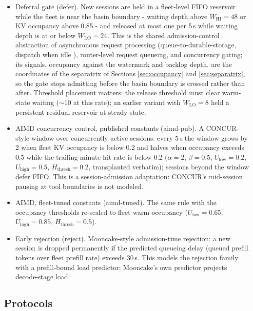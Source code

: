 \begin{itemize}
\item Deferral gate (defer). New sessions are held in a fleet-level FIFO
  reservoir while the fleet is near the basin boundary - waiting
  depth above $W_{\mathrm{HI}} = 48$ or KV occupancy above 0.85 - and released at
  most one per 5\,s while waiting depth is at or below $W_{\mathrm{LO}} = 24$.
  This is the shared admission-control abstraction of asynchronous
  request processing (queue-to-durable-storage, dispatch when idle
  \cite{llmdasync}), router-level request queueing, and concurrency
  gating; its signals, occupancy against the watermark and backlog
  depth, are the coordinates of the separatrix of Sections \ref{sec:occupancy} and
  \ref{sec:separatrix}, so the gate stops admitting before the basin boundary is
  crossed rather than after. Threshold placement matters: the
  release threshold must clear warm-state waiting ($\sim$10 at this
  rate); an earlier variant with $W_{\mathrm{LO}} = 8$ held a persistent residual
  reservoir at steady state.
\item AIMD concurrency control, published constants (aimd-pub). A
  CONCUR-style \cite{chen2026concur} window over concurrently active
  sessions: every 5\,s the window grows by 2 when fleet KV occupancy
  is below 0.2 and halves when occupancy exceeds 0.5 while the
  trailing-minute hit rate is below 0.2 ($\alpha{=}2$, $\beta{=}0.5$,
  $U_{\mathrm{low}}{=}0.2$, $U_{\mathrm{high}}{=}0.5$, $H_{\mathrm{thresh}}{=}0.2$, transplanted verbatim);
  sessions beyond the window defer FIFO. This is a session-admission
  adaptation: CONCUR's mid-session pausing at tool boundaries is not
  modeled.
\item AIMD, fleet-tuned constants (aimd-tuned). The same rule with the
  occupancy thresholds re-scaled to fleet warm occupancy
  ($U_{\mathrm{low}}{=}0.65$, $U_{\mathrm{high}}{=}0.85$, $H_{\mathrm{thresh}}{=}0.5$).
\item Early rejection (reject). Mooncake-style \cite{qin2025mooncake}
  admission-time rejection: a new session is dropped permanently if
  the predicted queueing delay (queued prefill tokens over fleet
  prefill rate) exceeds 30\,s. This models the rejection family with
  a prefill-bound load predictor; Mooncake's own predictor projects
  decode-stage load.
\end{itemize}

\subsection{Protocols}
\label{sec:protocols9}

